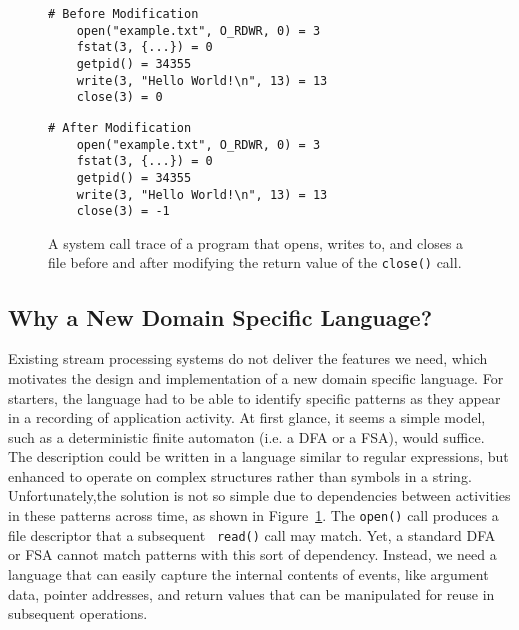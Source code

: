 \begin{figure}[t]
\begin{minipage}{.5\textwidth}
  \begin{lstlisting}[basicstyle=\ttfamily\scriptsize,gobble=4]
    # Before Modification
    open("example.txt", O_RDWR, 0) = 3
    fstat(3, {...}) = 0
    getpid() = 34355
    write(3, "Hello World!\n", 13) = 13
    close(3) = 0
  \end{lstlisting}
 \end{minipage}%
 \begin{minipage}{.5\textwidth}
  \begin{lstlisting}[basicstyle=\ttfamily\scriptsize]
    # After Modification
    open("example.txt", O_RDWR, 0) = 3
    fstat(3, {...}) = 0
    getpid() = 34355
    write(3, "Hello World!\n", 13) = 13
    close(3) = -1
  \end{lstlisting}
  \end{minipage}
  \caption{A system call trace of a program that opens, writes to, and closes
  a file before and after modifying the return value of the \texttt{close()} call.}
  \label{fig:StraceListing}
\end{figure}

\subsection{Why a New Domain Specific Language?}


Existing stream processing systems do not deliver the features we need, which motivates the design and implementation of a new domain specific language. For starters, the language  had to be able to identify specific
patterns as they appear in a recording of application activity.
At first glance, it seems a simple model,
such as a deterministic finite automaton (i.e. a DFA or a FSA), would suffice.
The description could be written
in a language similar to
regular expressions, but enhanced to operate on complex
structures rather than symbols in a string.
Unfortunately,the solution is not so simple due to  dependencies
between activities in these patterns
across time,
as shown in Figure~\ref{fig:StraceListing}.
The {\tt open()} call produces a file descriptor that a subsequent {\tt
read()} call may match.
Yet, a standard DFA or FSA cannot match patterns with this sort of dependency. 
Instead, we need a language
that can easily capture
the internal contents of events,
like argument data,
pointer addresses,
and return values that can be
manipulated for
reuse in subsequent operations.

